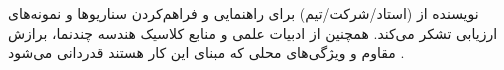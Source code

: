 نویسنده از (استاد/شرکت/تیم) برای راهنمایی و فراهم‌کردن سناریوها و نمونه‌های ارزیابی تشکر می‌کند. همچنین از ادبیات علمی و منابع کلاسیک هندسه چندنما، برازش مقاوم و ویژگی‌های محلی که مبنای این کار هستند قدردانی می‌شود \cite{HartleyZisserman2004,FischlerBolles1981,Rublee2011ORB}.

